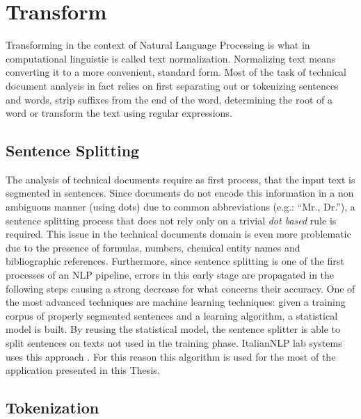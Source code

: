 \documentclass[]{book}
\begin{document}
\section{Transform}\label{sotatoolstransform}

Transforming in the context of Natural Language Processing is what in
computational linguistic is called text normalization. Normalizing text
means converting it to a more convenient, standard form. Most of the
task of technical document analysis in fact relies on first separating
out or tokenizing sentences and words, strip suffixes from the end of
the word, determining the root of a word or transform the text using
regular expressions.

\subsection{Sentence Splitting}\label{sotatoolstransformsentencesplit}

The analysis of technical documents require as first process, that the
input text is segmented in sentences. Since documents do not encode this
information in a non ambiguous manner (using dots) due to common
abbreviations (e.g.: ``Mr., Dr.''), a sentence splitting process that
does not rely only on a trivial \emph{dot based} rule is required. This
issue in the technical documents domain is even more problematic due to
the presence of formulas, numbers, chemical entity names and
bibliographic references. Furthermore, since sentence splitting is one
of the first processes of an NLP pipeline, errors in this early stage
are propagated in the following steps causing a strong decrease for what
concerns their accuracy. One of the most advanced techniques are machine
learning techniques: given a training corpus of properly segmented
sentences and a learning algorithm, a statistical model is built. By
reusing the statistical model, the sentence splitter is able to split
sentences on texts not used in the training phase. ItalianNLP lab
systems uses this approach \citep[\citet{attardi2009reverse},
\citet{attardi2009accurate}]{dell2009ensemble}. For this reason this
algorithm is used for the most of the application presented in this
Thesis.

\subsection{Tokenization}\label{tokenization}
\end{document}
